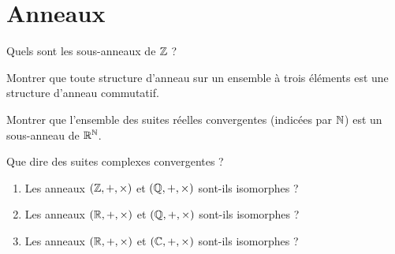 \begin{corr}
\end{corr}

\section{Anneaux}

\begin{exo}[Exercice 12]
Quels sont les sous-anneaux de \(\mathbb{Z}\) ?
\end{exo}

\begin{corr}
\end{corr}

\begin{exo}[Exercice 13]
Montrer que toute structure d'anneau sur un ensemble à trois éléments est une structure d'anneau commutatif.
\end{exo}

\begin{corr}
\end{corr}

\begin{exo}[Exercice 14]
Montrer que l'ensemble des suites réelles convergentes (indicées par \(\mathbb{N}\)) est un sous-anneau de \(\mathbb{R}^{\mathbb{N}}\).

Que dire des suites complexes convergentes ?
\end{exo}

\begin{corr}
\end{corr}

\begin{exo}[Exercice 15]
\begin{enumerate}
\item Les anneaux \(\anneau{\Z}\) et \(\anneau{\Q}\) sont-ils isomorphes ? \\

\item Les anneaux \(\anneau{\R}\) et \(\anneau{\Q}\) sont-ils isomorphes ? \\

\item Les anneaux \(\anneau{\R}\) et \(\anneau{\C}\) sont-ils isomorphes ?
\end{enumerate}
\end{exo}

\begin{corr}
\end{corr}

